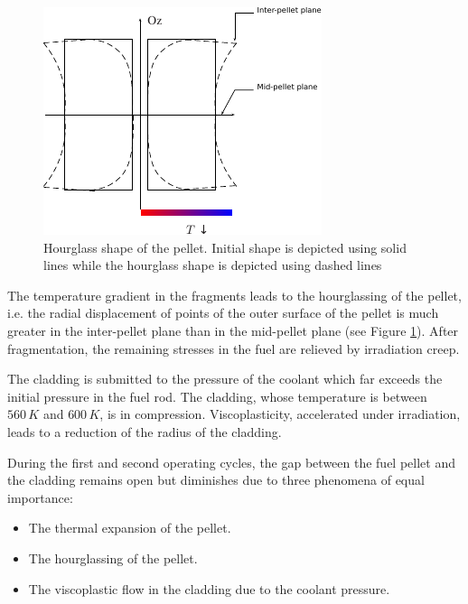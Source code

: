 \begin{figure}[H]
  \centering
  \includegraphics[width=10.cm]{../chapter_000_introduction/figures/HourGlassEffect.pdf}
  \caption{Hourglass shape of the pellet. Initial shape is depicted using solid
  lines while the hourglass shape is depicted using dashed
  lines}
  \label{fig:hho:hourglass}
\end{figure}


The temperature gradient in the fragments leads to the hourglassing of
the pellet, i.e. the radial displacement of points of the outer surface
of the pellet is much greater in the inter-pellet plane than in the
mid-pellet plane (see Figure \ref{fig:hho:hourglass}). After fragmentation,
the remaining stresses in the fuel are relieved by irradiation creep.

The cladding is submitted to the pressure of the coolant which far
exceeds the initial pressure in the fuel rod. The cladding, whose
temperature is between \(560\,K\) and \(600\,K\), is in compression.
Viscoplasticity, accelerated under irradiation, leads to a reduction of
the radius of the cladding.

During the first and second operating cycles, the gap between the fuel
pellet and the cladding remains open but diminishes due to three
phenomena of equal importance:

\begin{itemize}
  \item The thermal expansion of the pellet.
  \item The hourglassing of the pellet.
  \item The viscoplastic flow in the cladding due to the coolant pressure.
\end{itemize}


